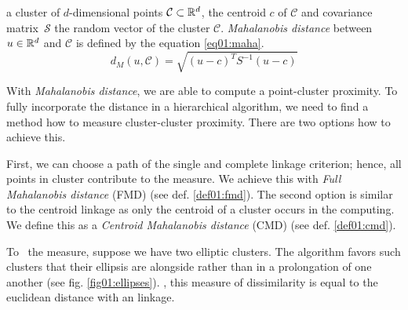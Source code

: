 \begin{defn}
	 a cluster of $d$-dimensional points $\mathcal{C} \subset \mathbb{R}^d$, the centroid $c$ of $\mathcal{C}$ and covariance matrix\ $\mathcal{S}$  the random vector  of the cluster $\mathcal{C}$. \emph{Mahalanobis distance} between $u \in \mathbb{R}^d$ and $\mathcal{C}$ is defined by the equation \ref{eq01:maha}.
	\begin{equation}\label{eq01:maha}
	d_M(u,\mathcal{C}) = \sqrt{(u-c)^TS^{-1}(u-c)}
	\end{equation}
	\label{def01:maha}
\end{defn}


With \emph{Mahalanobis distance}, we are able to compute a point-cluster proximity. To fully incorporate the distance in a hierarchical algorithm, we need to find a method how to measure cluster-cluster proximity. There are two options how to achieve this.

First, we can choose a path of the single and complete linkage criterion; hence, all points in cluster contribute to the measure. We achieve this with \emph{Full Mahalanobis distance} (FMD) (see def. \ref{def01:fmd}).
The second option is similar to the centroid linkage as only the centroid of a cluster occurs in the computing. We define this as a \emph{Centroid Mahalanobis distance} (CMD) (see def. \ref{def01:cmd}). 

To \ the measure, suppose we have two elliptic clusters. The algorithm favors such clusters that their ellipsis are alongside rather than in a prolongation of one another \cite{dagnelie1991using} (see fig. \ref{fig01:ellipses}). , this measure of dissimilarity is equal to the euclidean distance with an  linkage.

